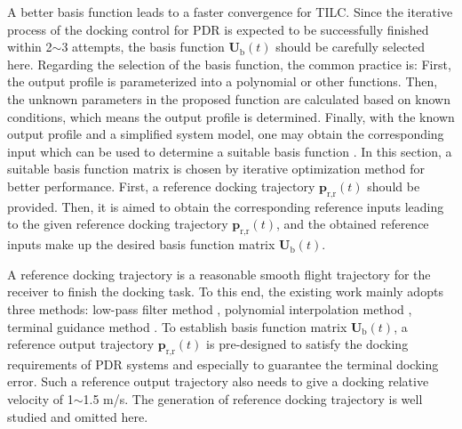 A better basis function leads to a faster convergence for TILC. Since the
iterative process of the docking control for PDR is expected to be
successfully finished within 2$\sim$3 attempts, the basis function
$\mathbf{U}_{\text{b}}\left(  t\right)  $ should be carefully selected here.
Regarding the selection of the basis function, the common practice is: First,
the output profile is parameterized into a polynomial or other functions.
Then, the unknown parameters in the proposed function are calculated based on
known conditions, which means the output profile is determined. Finally, with
the known output profile and a simplified system model, one may obtain the
corresponding input which can be used to determine a suitable basis function
\cite{Xu1999Terminal}. In this section, a suitable basis function matrix is
chosen by iterative optimization method for better performance. First, a
reference docking trajectory $\mathbf{p}_{\text{r,r}}\left(  t\right)  $
should be provided. Then, it is aimed to obtain the corresponding reference
inputs leading to the given reference docking trajectory $\mathbf{p}%
_{\text{r,r}}\left(  t\right)  $, and the obtained reference inputs make up
the desired basis function matrix $\mathbf{U}_{\text{b}}\left(  t\right)  $.

A reference docking trajectory is a reasonable smooth flight trajectory for
the receiver to finish the docking task. To this end, the existing work
mainly adopts three methods: low-pass filter method
\cite{fravolini2003development}, polynomial interpolation method
\cite{fravolini2004modeling}, terminal guidance method \cite{ochi2005flight}.
To establish basis function matrix $\mathbf{U}_{\text{b}}\left(  t\right)  $,
a reference output trajectory $\mathbf{p}_{\text{r,r}}\left(  t\right)  $ is
pre-designed to satisfy the docking requirements of PDR systems and especially
to guarantee the terminal docking error. Such a reference output trajectory
also needs to give a docking relative velocity of 1$\sim$1.5 m/s. The
generation of reference docking trajectory is well studied and omitted here.

